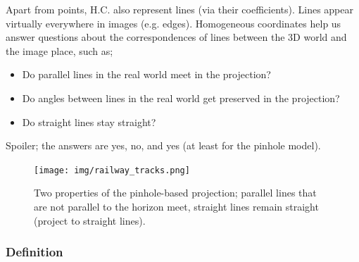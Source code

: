\documentclass[a4paper]{article}
\begin{document}
Apart from points, H.C. also represent lines (via their coefficients). Lines appear virtually everywhere in images (e.g. edges). Homogeneous coordinates help us answer questions about the correspondences of lines between the 3D world and the image place, such as; 
\begin{itemize}
    \item Do parallel lines in the real world meet in the projection?
    \item Do angles between lines in the real world get preserved in the projection?
    \item Do straight lines stay straight?
\end{itemize}
Spoiler; the answers are yes, no, and yes (at least for the pinhole model).
\begin{figure}[H]
    \centering
    \texttt{[image: img/railway\_tracks.png]}
    \caption{Two properties of the pinhole-based projection; parallel lines that are not parallel to the horizon meet, straight lines remain straight (project to straight lines).}
    \label{fig:my_label}
\end{figure}

\subsubsection{Definition}
\end{document}
